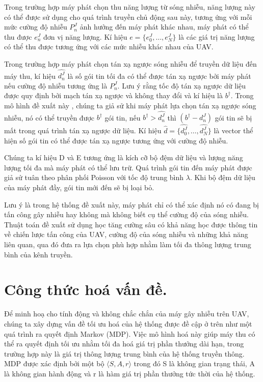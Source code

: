 \documentclass{uetgraduation}
\begin{document}
Trong trường hợp máy phát chọn thu năng lượng từ sóng nhiễu, năng lượng này có thể được sử dụng cho quá trình truyền chủ động sau này, tương ứng với mỗi mức cường độ nhiễu $P_n^J$
ảnh hưởng đến máy phát khác nhau, máy phát có thể thu được $e_n^J$ đơn vị năng lượng. Kí hiệu $e = \{e_0^J, \dots, e_N^J\}$ là các giá trị năng lượng có thể thu được tương ứng
với các mức nhiễu khác nhau của UAV.

Trong trường hợp máy phát chọn tán xạ ngược sóng nhiễu để truyền dữ liệu đến máy thu, kí hiệu $\hat{d_n^J}$ là số gói tin tối đa có thể được tán xạ ngược bởi máy phát nếu
cường độ nhiễu tương ứng là $P_n^J$. Lưu ý rằng tốc độ tán xạ ngược dữ liệu được quy định bởi mạch tán xạ ngược và không thay đổi và kí hiệu là $b^{\dagger}$. Trong mô hình đề xuất này
, chúng ta giả sử khi máy phát lựa chọn tán xạ ngược sóng nhiễu, nó có thể truyền được $b^{\dagger}$ gói tin, nếu $b^{\dagger} > \hat{d_n^J}$ thì $(b^{\dagger} - d_n^J)$ gói tin sẽ bị mất trong
quá trình tán xạ ngược dữ liệu. Kí hiệu $\hat{d} = \{\hat{d_0^J}, \dots, \hat{d_N^J}\}$ là vector thể hiện số gói tin có thể được tán xạ ngược tương ứng với cường độ nhiễu.

Chúng ta kí hiệu D và E tương ứng là kích cỡ bộ đệm dữ liệu và lượng năng lượng tối đa mà máy phát có thể lưu trữ. Quá trình gói tin đến máy phát được giả sử tuân theo phân
phối Poisson với tốc độ trung bình $\lambda$. Khi bộ đệm dữ liệu của máy phát đầy, gói tin mới đến sẽ bị loại bỏ.

Lưu ý là trong hệ thống đề xuất này, máy phát chỉ có thể xác định nó có đang bị tấn công gây nhiễu hay không mà không biết cụ thể cường độ của sóng nhiễu. Thuật toán đề xuất sử dụng học tăng 
cường sâu có khả năng học được thông tin về chiến lược tấn công của UAV, cường độ của sóng nhiễu và những khả năng liên quan, qua đó đưa ra lựa chọn
phù hợp nhằm làm tối đa thông lượng trung bình của kênh truyền.


\section{Công thức hoá vấn đề.}
Để minh hoạ cho tính động và không chắc chắn của máy gây nhiễu trên UAV, chúng ta xây dựng vấn đề tối ưu hoá của hệ thống được đề cập ở trên như một quá trình ra quyết định
Markov (MDP). Việc mô hình hoá này giúp máy thu có thể ra quyết định tối ưu nhằm tối đa hoá giá trị phần thưởng dài hạn, trong trường hợp này là giá trị thông lượng trung bình
của hệ thống truyền thông. MDP được xác định bởi một bộ $\langle S, A, r \rangle$ trong đó S là không gian trạng thái, A là không gian hành động và r là hàm giá trị phần thưởng
tức thời của hệ thống.
\end{document}
